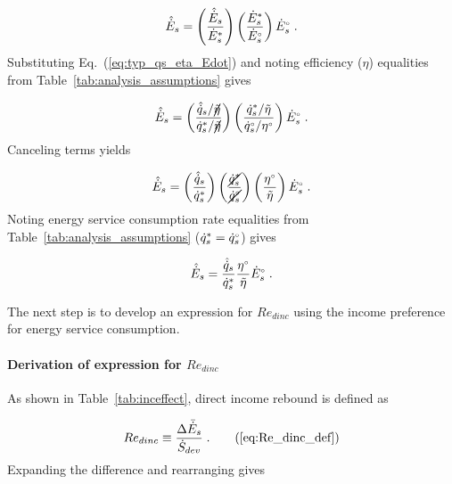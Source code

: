 \begin{equation}
  \hat{\dot{E}}_s = \left( \frac{\hat{\dot{E}}_s}{{\dot{E}}^*_s} \right)
                \left( \frac{{\dot{E}}^*_s}{{}{\dot{E}}^{\scriptscriptstyle \circ}_s} \right)
                {}{\dot{E}}^{\scriptscriptstyle \circ}_s \; .
\end{equation}
%
Substituting Eq.~(\ref{eq:typ_qs_eta_Edot}) and noting efficiency ($\eta$)
equalities from Table~\ref{tab:analysis_assumptions} gives

\begin{equation}
  \hat{\dot{E}}_s = \left( \frac{\hat{\dot{q}}_s / \cancel{\tilde{\eta}}}{{\dot{q}}^*_s / \cancel{\tilde{\eta}}} \right)
                \left( \frac{{\dot{q}}^*_s / \tilde{\eta}}{{}{\dot{q}}^{\scriptscriptstyle \circ}_s / {}{\eta}^{\scriptscriptstyle \circ}} \right)
                {}{\dot{E}}^{\scriptscriptstyle \circ}_s \; .
\end{equation}
%
Canceling terms yields

\begin{equation}
  \hat{\dot{E}}_s = \left( \frac{\hat{\dot{q}}_s}{{\dot{q}}^*_s} \right)
                \left( \frac{\cancel{{\dot{q}}^*_s}}{\cancel{{}{\dot{q}}^{\scriptscriptstyle \circ}_s}} \right)
                \left( \frac{{}{\eta}^{\scriptscriptstyle \circ}}{\tilde{\eta}}  \right)
                {}{\dot{E}}^{\scriptscriptstyle \circ}_s \; .
\end{equation}
%
Noting energy service consumption rate equalities from Table~\ref{tab:analysis_assumptions}
(${\dot{q}}^*_s = {}{\dot{q}}^{\scriptscriptstyle \circ}_s$) gives

\begin{equation} \label{eq:E_dot_s_hat}
  \hat{\dot{E}}_s = \frac{\hat{\dot{q}}_s}{{\dot{q}}^*_s}
                \frac{{}{\eta}^{\scriptscriptstyle \circ}}{\tilde{\eta}}
                {}{\dot{E}}^{\scriptscriptstyle \circ}_s \; .
\end{equation}

The next step is to develop an expression for $Re_{dinc}$
using the income preference for energy service consumption.


\paragraph{Derivation of expression for $Re_{dinc}$}
\label{sec:Re_dinc}

As shown in Table~\ref{tab:inceffect}, direct income rebound is defined as

\begin{equation}
  Re_{dinc} \equiv \frac{\Delta \rainc{E}_s}{\Sdot} \; . \tag{\ref{eq:Re_dinc_def}}
\end{equation}
%
Expanding the difference and rearranging gives

